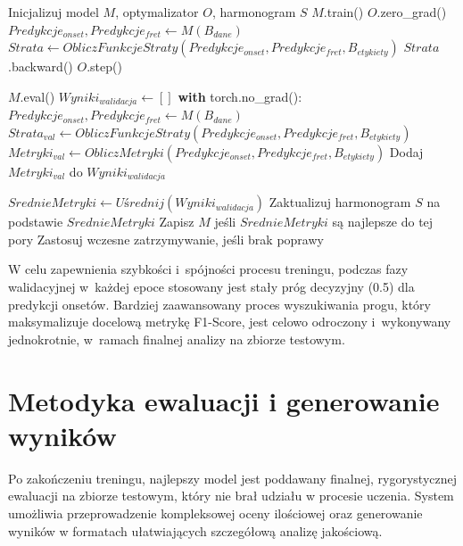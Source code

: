 \begin{algorithm}
\caption{Pseudokod pętli treningowej i walidacyjnej}
\label{alg:training_loop}
\begin{algorithmic}[1]
\State Inicjalizuj model $M$, optymalizator $O$, harmonogram $S$
    \State $M$.train()  
        \State $O$.zero\_grad()  
        \State $Predykcje_{onset}, Predykcje_{fret} \gets M(B_{dane})$
        \State $Strata \gets ObliczFunkcjeStraty(Predykcje_{onset}, Predykcje_{fret}, B_{etykiety})$
        \State $Strata$.backward()  
        \State $O$.step()  
    \EndFor
    
    \State $M$.eval()  
    \State $Wyniki_{walidacja} \gets []$
    \State \textbf{with} torch.no\_grad(): 
        \State $Predykcje_{onset}, Predykcje_{fret} \gets M(B_{dane})$
        \State $Strata_{val} \gets ObliczFunkcjeStraty(Predykcje_{onset}, Predykcje_{fret}, B_{etykiety})$
        \State $Metryki_{val} \gets ObliczMetryki(Predykcje_{onset}, Predykcje_{fret}, B_{etykiety})$
        \State Dodaj $Metryki_{val}$ do $Wyniki_{walidacja}$
    \EndFor
    
    \State $SrednieMetryki \gets Uśrednij(Wyniki_{walidacja})$
    \State Zaktualizuj harmonogram $S$ na podstawie $SrednieMetryki$
    \State Zapisz $M$ jeśli $SrednieMetryki$ są najlepsze do tej pory
    \State Zastosuj wczesne zatrzymywanie, jeśli brak poprawy
\EndFor
\end{algorithmic}
\end{algorithm}

W celu zapewnienia szybkości i~spójności procesu treningu, podczas fazy walidacyjnej w~każdej epoce stosowany jest stały próg decyzyjny (0.5) dla predykcji onsetów. Bardziej zaawansowany proces wyszukiwania progu, który maksymalizuje docelową metrykę F1-Score, jest celowo odroczony i~wykonywany jednokrotnie, w~ramach finalnej analizy na zbiorze testowym.

\section{Metodyka ewaluacji i generowanie wyników}
\label{sec:metodyka_ewaluacji}

Po zakończeniu treningu, najlepszy model jest poddawany finalnej, rygorystycznej ewaluacji na zbiorze testowym, który nie brał udziału w procesie uczenia. System umożliwia przeprowadzenie kompleksowej oceny ilościowej oraz generowanie wyników w formatach ułatwiających szczegółową analizę jakościową.

